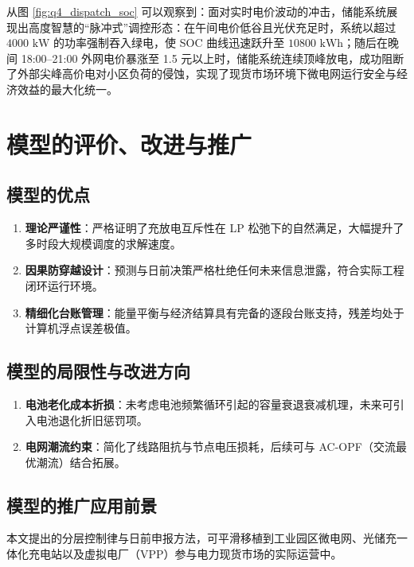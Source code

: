 \documentclass[withoutpreface]{cumcmthesis}
\begin{document}
从图 \ref{fig:q4_dispatch_soc} 可以观察到：面对实时电价波动的冲击，储能系统展现出高度智慧的“脉冲式”调控形态：在午间电价低谷且光伏充足时，系统以超过 $4000\text{ kW}$ 的功率强制吞入绿电，使 SOC 曲线迅速跃升至 $10800\text{ kWh}$；随后在晚间 18:00--21:00 外网电价暴涨至 1.5 元以上时，储能系统连续顶峰放电，成功阻断了外部尖峰高价电对小区负荷的侵蚀，实现了现货市场环境下微电网运行安全与经济效益的最大化统一。
\section{模型的评价、改进与推广}

\subsection{模型的优点}
\begin{enumerate}
    \item \textbf{理论严谨性}：严格证明了充放电互斥性在 LP 松弛下的自然满足，大幅提升了多时段大规模调度的求解速度。
    \item \textbf{因果防穿越设计}：预测与日前决策严格杜绝任何未来信息泄露，符合实际工程闭环运行环境。
    \item \textbf{精细化台账管理}：能量平衡与经济结算具有完备的逐段台账支持，残差均处于计算机浮点误差极值。
\end{enumerate}

\subsection{模型的局限性与改进方向}
\begin{enumerate}
    \item \textbf{电池老化成本折损}：未考虑电池频繁循环引起的容量衰退衰减机理，未来可引入电池退化折旧惩罚项。
    \item \textbf{电网潮流约束}：简化了线路阻抗与节点电压损耗，后续可与 AC-OPF（交流最优潮流）结合拓展。
\end{enumerate}

\subsection{模型的推广应用前景}
本文提出的分层控制律与日前申报方法，可平滑移植到工业园区微电网、光储充一体化充电站以及虚拟电厂（VPP）参与电力现货市场的实际运营中。
\end{document}
